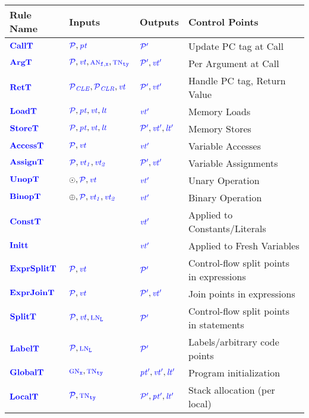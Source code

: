 \documentclass{llncs}
\begin{document}
\begin{table}[t]
  \begin{tabular}{|l|l|l|l|}
    \hline
    Rule Name & Inputs & Outputs & Control Points \\
    \hline
    \(\calltname\)      & \(\calltargs\)         & \(\calltres\)      & Update PC tag at Call \\
    \(\argtname\)       & \(\argtargs\)          & \(\argtres\)       & Per Argument at Call \\
    \(\rettname\)       & \(\rettargs\)          & \(\rettres\)       & Handle PC tag, Return Value \\
    \(\loadtname\)      & \(\loadtargs\)         & \(\loadtres\)      & Memory Loads \\
    \(\storetname\)     & \(\storetargs\)        & \(\storetres\)     & Memory Stores \\
    \(\accesstname\)    & \(\accesstargs\)       & \(\accesstres\)    & Variable Accesses \\
    \(\assigntname\)    & \(\assigntargs\)       & \(\assigntres\)    & Variable Assignments \\
    \(\unoptname\)      & \(\unoptargs\)         & \(\unoptres\)      & Unary Operation \\
    \(\binoptname\)     & \(\binoptargs\)        & \(\binoptres\)     & Binary Operation \\
    \(\consttname\)     &                        & \(\consttres\)     & Applied to Constants/Literals \\
    \(\inittname\)      &                        & \(\inittres\)      & Applied to Fresh Variables \\
    \(\exprsplittname\) & \(\exprsplittargs\)    & \(\exprsplittres\) & Control-flow split points in expressions \\
    \(\exprjointname\)  & \(\exprjointargs\)     & \(\exprjointres\)  & Join points in expressions \\
    \(\splittname\)     & \(\splittargs\)        & \(\splittres\)     & Control-flow split points in statements\\
    \(\labeltname\)     & \(\labeltargs\)        & \(\labeltres\)     & Labels/arbitrary code points \\
    \(\globaltname\)    & \(\globaltargs\)       & \(\globaltres\)    & Program initialization \\
    \(\localtname\)     & \(\localtargs\)        & \(\localtres\)     & Stack allocation (per local) \\

\end{tabular}
\end{table}
\end{document}
